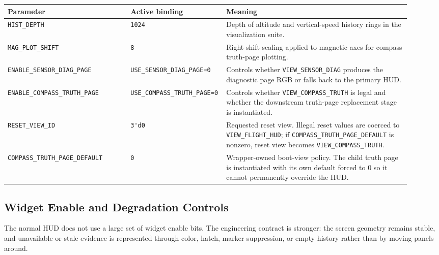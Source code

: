 \documentclass{article}
\newcommand{\sig}[1]{\begingroup\nolinkurl{#1}\endgroup}
\newcommand{\param}[1]{\begingroup\nolinkurl{#1}\endgroup}
\begin{document}
\begin{longtable}{p{0.30\linewidth} p{0.17\linewidth} p{0.45\linewidth}}
\toprule
\textbf{Parameter} & \textbf{Active binding} & \textbf{Meaning} \\
\midrule
\endhead
\param{HIST_DEPTH} & \sig{1024} &
Depth of altitude and vertical-speed history rings in the visualization suite. \\
\param{MAG_PLOT_SHIFT} & \sig{8} &
Right-shift scaling applied to magnetic axes for compass truth-page plotting. \\
\param{ENABLE_SENSOR_DIAG_PAGE} & \sig{USE_SENSOR_DIAG_PAGE=0} &
Controls whether \sig{VIEW_SENSOR_DIAG} produces the diagnostic page RGB or
falls back to the primary HUD. \\
\param{ENABLE_COMPASS_TRUTH_PAGE} & \sig{USE_COMPASS_TRUTH_PAGE=0} &
Controls whether \sig{VIEW_COMPASS_TRUTH} is legal and whether the downstream
truth-page replacement stage is instantiated. \\
\param{RESET_VIEW_ID} & \sig{3'd0} &
Requested reset view.  Illegal reset values are coerced to
\sig{VIEW_FLIGHT_HUD}; if \param{COMPASS_TRUTH_PAGE_DEFAULT} is nonzero, reset
view becomes \sig{VIEW_COMPASS_TRUTH}. \\
\param{COMPASS_TRUTH_PAGE_DEFAULT} & \sig{0} &
Wrapper-owned boot-view policy.  The child truth page is instantiated with its
own default forced to 0 so it cannot permanently override the HUD. \\
\bottomrule
\end{longtable}

\subsection{Widget Enable and Degradation Controls}

The normal HUD does not use a large set of widget enable bits.  The engineering
contract is stronger: the screen geometry remains stable, and unavailable or
stale evidence is represented through color, hatch, marker suppression, or
empty history rather than by moving panels around.
\end{document}
